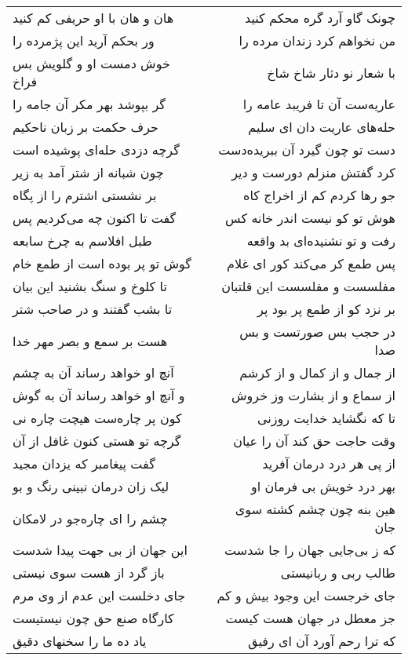 \begin{center}
\begin{longtable}{l p{0.5cm} r}
\\
هان و هان با او حریفی کم کنید
&&
چونک گاو آرد گره محکم کنید
\\
ور بحکم آرید این پژمرده را
&&
من نخواهم کرد زندان مرده را
\\
خوش دمست او و گلویش بس فراخ
&&
با شعار نو دثار شاخ شاخ
\\
گر بپوشد بهر مکر آن جامه را
&&
عاریه‌ست آن تا فریبد عامه را
\\
حرف حکمت بر زبان ناحکیم
&&
حله‌های عاریت دان ای سلیم
\\
گرچه دزدی حله‌ای پوشیده است
&&
دست تو چون گیرد آن ببریده‌دست
\\
چون شبانه از شتر آمد به زیر
&&
کرد گفتش منزلم دورست و دیر
\\
بر نشستی اشترم را از پگاه
&&
جو رها کردم کم از اخراج کاه
\\
گفت تا اکنون چه می‌کردیم پس
&&
هوش تو کو نیست اندر خانه کس
\\
طبل افلاسم به چرخ سابعه
&&
رفت و تو نشنیده‌ای بد واقعه
\\
گوش تو پر بوده است از طمع خام
&&
پس طمع کر می‌کند کور ای غلام
\\
تا کلوخ و سنگ بشنید این بیان
&&
مفلسست و مفلسست این قلتبان
\\
تا بشب گفتند و در صاحب شتر
&&
بر نزد کو از طمع پر بود پر
\\
هست بر سمع و بصر مهر خدا
&&
در حجب بس صورتست و بس صدا
\\
آنچ او خواهد رساند آن به چشم
&&
از جمال و از کمال و از کرشم
\\
و آنچ او خواهد رساند آن به گوش
&&
از سماع و از بشارت وز خروش
\\
کون پر چاره‌ست هیچت چاره نی
&&
تا که نگشاید خدایت روزنی
\\
گرچه تو هستی کنون غافل از آن
&&
وقت حاجت حق کند آن را عیان
\\
گفت پیغامبر که یزدان مجید
&&
از پی هر درد درمان آفرید
\\
لیک زان درمان نبینی رنگ و بو
&&
بهر درد خویش بی فرمان او
\\
چشم را ای چاره‌جو در لامکان
&&
هین بنه چون چشم کشته سوی جان
\\
این جهان از بی جهت پیدا شدست
&&
که ز بی‌جایی جهان را جا شدست
\\
باز گرد از هست سوی نیستی
&&
طالب ربی و ربانیستی
\\
جای دخلست این عدم از وی مرم
&&
جای خرجست این وجود بیش و کم
\\
کارگاه صنع حق چون نیستیست
&&
جز معطل در جهان هست کیست
\\
یاد ده ما را سخنهای دقیق
&&
که ترا رحم آورد آن ای رفیق

\end{longtable}
\end{center}
